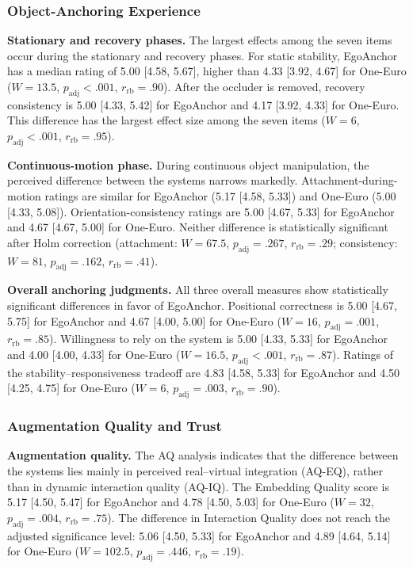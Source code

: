\documentclass[review]{vgtc}
\begin{document}
\subsubsection{Object-Anchoring Experience}

\textbf{Stationary and recovery phases.}
The largest effects among the seven items occur during the stationary and recovery phases. For static stability, EgoAnchor has a median rating of 5.00 [4.58, 5.67], higher than 4.33 [3.92, 4.67] for One-Euro ($W=13.5$, $p_{\mathrm{adj}}<.001$, $r_{\mathrm{rb}}=.90$). After the occluder is removed, recovery consistency is 5.00 [4.33, 5.42] for EgoAnchor and 4.17 [3.92, 4.33] for One-Euro. This difference has the largest effect size among the seven items ($W=6$, $p_{\mathrm{adj}}<.001$, $r_{\mathrm{rb}}=.95$).

\textbf{Continuous-motion phase.}
During continuous object manipulation, the perceived difference between the systems narrows markedly. Attachment-during-motion ratings are similar for EgoAnchor (5.17 [4.58, 5.33]) and One-Euro (5.00 [4.33, 5.08]). Orientation-consistency ratings are 5.00 [4.67, 5.33] for EgoAnchor and 4.67 [4.67, 5.00] for One-Euro. Neither difference is statistically significant after Holm correction (attachment: $W=67.5$, $p_{\mathrm{adj}}=.267$, $r_{\mathrm{rb}}=.29$; consistency: $W=81$, $p_{\mathrm{adj}}=.162$, $r_{\mathrm{rb}}=.41$).

\textbf{Overall anchoring judgments.}
All three overall measures show statistically significant differences in favor of EgoAnchor. Positional correctness is 5.00 [4.67, 5.75] for EgoAnchor and 4.67 [4.00, 5.00] for One-Euro ($W=16$, $p_{\mathrm{adj}}=.001$, $r_{\mathrm{rb}}=.85$). Willingness to rely on the system is 5.00 [4.33, 5.33] for EgoAnchor and 4.00 [4.00, 4.33] for One-Euro ($W=16.5$, $p_{\mathrm{adj}}<.001$, $r_{\mathrm{rb}}=.87$). Ratings of the stability--responsiveness tradeoff are 4.83 [4.58, 5.33] for EgoAnchor and 4.50 [4.25, 4.75] for One-Euro ($W=6$, $p_{\mathrm{adj}}=.003$, $r_{\mathrm{rb}}=.90$).

\subsubsection{Augmentation Quality and Trust}

\textbf{Augmentation quality.}
The AQ analysis indicates that the difference between the systems lies mainly in perceived real--virtual integration (AQ-EQ), rather than in dynamic interaction quality (AQ-IQ). The Embedding Quality score is 5.17 [4.50, 5.47] for EgoAnchor and 4.78 [4.50, 5.03] for One-Euro ($W=32$, $p_{\mathrm{adj}}=.004$, $r_{\mathrm{rb}}=.75$). The difference in Interaction Quality does not reach the adjusted significance level: 5.06 [4.50, 5.33] for EgoAnchor and 4.89 [4.64, 5.14] for One-Euro ($W=102.5$, $p_{\mathrm{adj}}=.446$, $r_{\mathrm{rb}}=.19$).
\end{document}
